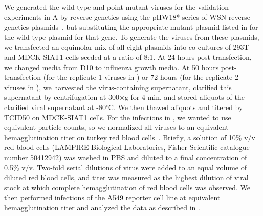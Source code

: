 \documentclass[9pt,lineno]{template}
\begin{document}
We generated the wild-type and point-mutant viruses for the validation experiments in A by reverse genetics using the pHW18* series of WSN reverse genetics plasmids~\citep{hoffmann2000dna}, but substituting the appropriate mutant plasmid listed in  for the wild-type plasmid for that gene.
To generate the viruses from these plasmids, we transfected an equimolar mix of all eight plasmids into co-cultures of 293T and MDCK-SIAT1 cells seeded at a ratio of 8:1.
At 24 hours post-transfection, we changed media from D10 to influenza growth media. 
At 50 hours post-transfection (for the replicate 1 viruses in ) or 72 hours (for the replicate 2 viruses in ), we harvested the virus-containing supernatant, clarified this supernatant by centrifugation at 300$\times$g for 4 min, and stored aliquots of the clarified viral supernatant at -80$^{\circ}$C.
We then thawed aliquots and titered by TCID50 on MDCK-SIAT1 cells.
For the infections in , we wanted to use equivalent particle counts, so we normalized all viruses to an equivalent hemagglutination titer on turkey red blood cells~\citep{hirst1942quantitative}.
 Briefly, a solution of 10\% v/v red blood cells (LAMPIRE Biological Laboratories, Fisher Scientific catalogue number 50412942)  was washed in PBS and diluted to a final concentration of 0.5\% v/v. 
Two-fold serial dilutions of virus were added to an equal volume of diluted red blood cells, and titer was measured as the highest dilution of viral stock at which complete hemagglutination of red blood cells was observed.
We then performed infections of the A549 reporter cell line at equivalent hemagglutination titer and analyzed the data as described in . 
\end{document}
